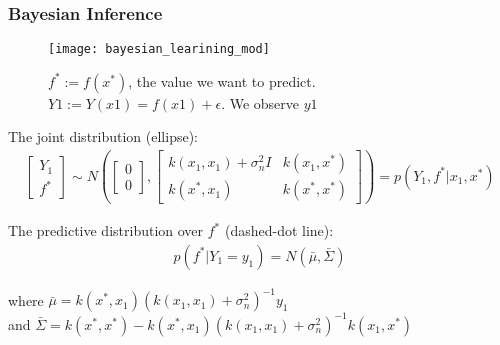 \documentclass[
	8pt, %
]{beamer}
\begin{document}
\begin{frame}
	\frametitle{Bayesian Inference}
	\begin{figure}
			\texttt{[image: bayesian\_learining\_mod]}
			\caption{$f^{\ast} := f(x^\ast)$, the value we want to predict.
				$Y1 := Y(x1) = f(x1) + \epsilon$. We observe $y1$}
	\end{figure}

	The joint distribution (ellipse):
	\begin{gather}
		\begin{bmatrix}
			Y_1 \\
			f^{\ast}
		\end{bmatrix}
		\sim N \left(
			\begin{bmatrix}
			0 \\
			0
			\end{bmatrix},
			\begin{bmatrix}
			k(x_1, x_1) + \sigma_n^2 I & k(x_1, x^{\ast}) \\
			k(x^{\ast}, x_1) & k(x^{\ast}, x^{\ast})
			\end{bmatrix}
			\right)
		= p(Y_1, f^{\ast}| x_1, x^{\ast})
	\end{gather}

	The predictive distribution over $f^{\ast}$ (dashed-dot line):
	\begin{gather}
		p(f^{\ast}| Y_1 = y_1) = N(\bar{\mu}, \bar{\Sigma})
	\end{gather}

	where $\bar{\mu} = k(x^{\ast}, x_1) (k(x_1, x_1) + \sigma_n^2)^{-1} y_1$ \\
	and $\bar{\Sigma} = k(x^{\ast}, x^{\ast}) - k(x^{\ast}, x_1)(k(x_1, x_1) + \sigma_n^2)^{-1} k(x_1, x^{\ast})$

\end{frame}
\end{document}
